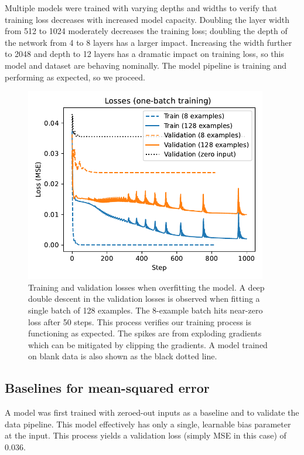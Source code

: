 Multiple models were trained with varying depths and widths to verify that training loss decreases with increased model capacity. Doubling the layer width from 512 to 1024 moderately decreases the training loss; doubling the depth of the network from 4 to 8 layers has a larger impact. Increasing the width further to 2048 and depth to 12 layers has a dramatic impact on training loss, so this model and dataset are behaving nominally. The model pipeline is training and performing as expected, so we proceed.

\begin{figure}
	\centering
	\includegraphics[width=300pt]{figures/PP1_overfit_losses.pdf}
	\caption[Training and validation losses when overfitting the model]{\label{fig:PP1_overfit_losses}Training and validation losses when overfitting the model. A deep double descent in the validation losses is observed when fitting a single batch of 128 examples. The 8-example batch hits near-zero loss after 50 steps. This process verifies our training process is functioning as expected. The spikes are from exploding gradients which can be mitigated by clipping the gradients. A model trained on blank data is also shown as the black dotted line.}
\end{figure}

\subsection{Baselines for mean-squared error}
\label{sec:baselines}

A model was first trained with zeroed-out inputs as a baseline and to validate the data pipeline. This model effectively has only a single, learnable bias parameter at the input. This process yields a validation loss (simply MSE in this case) of 0.036. 

